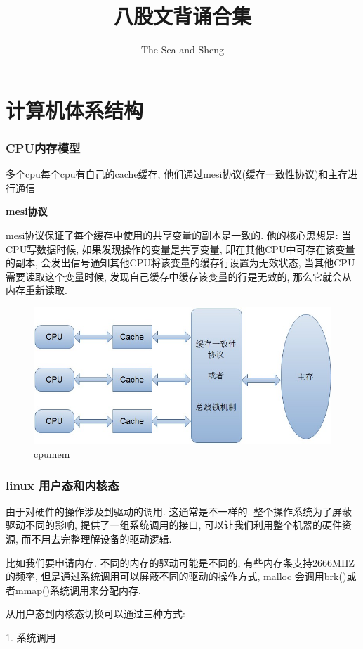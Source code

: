 \documentclass[UTF8]{ctexart}
\begin{document}
\title{八股文背诵合集}
\author{The Sea and Sheng}
\maketitle

\tableofcontents
\newpage
\section{计算机体系结构}
\subsubsection{CPU内存模型}
多个cpu每个cpu有自己的cache缓存, 他们通过mesi协议(缓存一致性协议)和主存进行通信

\textbf{mesi协议}

mesi协议保证了每个缓存中使用的共享变量的副本是一致的. 他的核心思想是: 当CPU写数据时候, 如果发现操作的变量是共享变量, 即在其他CPU中可存在该变量的副本, 会发出信号通知其他CPU将该变量的缓存行设置为无效状态, 当其他CPU需要读取这个变量时候, 发现自己缓存中缓存该变量的行是无效的, 那么它就会从内存重新读取.

\begin{figure}
	\centering
	\includegraphics[width=0.7\linewidth]{figures/cpumem.jpg}
	\caption{cpumem}
	\label{fig:cpumem}
\end{figure}

\subsubsection{linux 用户态和内核态}
由于对硬件的操作涉及到驱动的调用. 这通常是不一样的. 整个操作系统为了屏蔽驱动不同的影响, 提供了一组系统调用的接口, 可以让我们利用整个机器的硬件资源, 而不用去完整理解设备的驱动逻辑.

比如我们要申请内存. 不同的内存的驱动可能是不同的, 有些内存条支持2666MHZ的频率, 但是通过系统调用可以屏蔽不同的驱动的操作方式, malloc 会调用brk()或者mmap()系统调用来分配内存.

从用户态到内核态切换可以通过三种方式:

1. 系统调用
\end{document}
